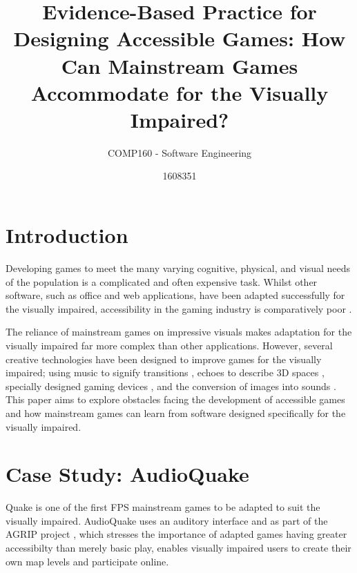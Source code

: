 \documentclass{scrartcl}
\title{Evidence-Based Practice for Designing Accessible Games: How Can Mainstream Games Accommodate for the Visually Impaired?}
\subtitle{COMP160 - Software Engineering}
\author{1608351}
\begin{document}
\maketitle


\section{Introduction}

{Developing games to meet the many varying cognitive, physical, and visual needs of the population is a complicated and often expensive task. Whilst other software, such as office and web applications, have been adapted successfully for the visually impaired, accessibility in the gaming industry is comparatively poor \cite{13}.

The reliance of mainstream games on impressive visuals makes adaptation for the visually impaired far more complex than other applications. However, several creative technologies have been designed to improve games for the visually impaired; using music to signify transitions \cite{1}, echoes to describe 3D spaces \cite{5}, specially designed gaming devices \cite{2} \cite{8}, and the conversion of images into sounds \cite{9}. This paper aims to explore obstacles facing the development of accessible games and how mainstream games can learn from software designed specifically for the visually impaired.}

\section{Case Study: AudioQuake}

Quake \cite{4} is one of the first FPS mainstream games to be adapted to suit the visually impaired. AudioQuake uses an auditory interface \cite{5} and as part of the AGRIP project \cite{6}, which stresses the importance of adapted games having greater accessibilty than merely basic play, enables visually impaired users to create their own map levels and participate online. 
\end{document}
